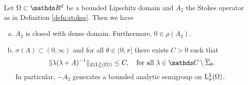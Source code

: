 \newpage
\begin{prop}
  \label{prop:stokesOperatorL2}
  Let $\Omega \subset \R^d$ be a bounded Lipschitz domain and $A_2$ the Stokes operator as in Definition \ref{defn:stokes}. Then we have
  \begin{enumerate}[a)]
    \item $A_2$ is closed with dense domain. Furthermore, $0 \in \rho(A_2)$.
    \item $\sigma(A) \subset (0,\infty)$ and for all $\theta \in (0,\pi]$ there exists $C > 0$ such that
      \begin{align}
        \label{eq:resolventEstimateL2}
        \| \lambda(\lambda + A)^{-1} \|_{\Li(\Ell^2_\sigma(\Omega))} \leq C, \quad\text{for all } \lambda \in \C \setminus \overline \Sigma_\theta.
      \end{align}
      In particular, $-A_2$ generates a bounded analytic semigroup on $\mathrm{L}^2_\sigma(\Omega)$.
  \end{enumerate}
\end{prop}


